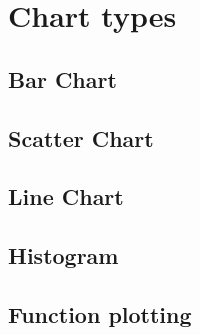 \chapter{Chart types}

\section{Bar Chart}

\section{Scatter Chart}

\section{Line Chart}

\section{Histogram}

\section{Function plotting}
